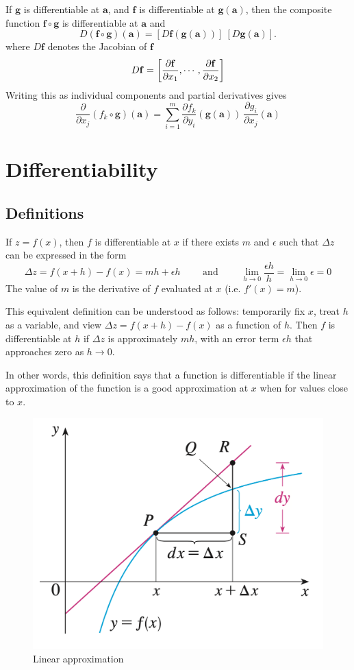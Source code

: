 If $\mathbf g$ is differentiable at $\mathbf a$, and $\mathbf f$ is differentiable at $\mathbf{g}(\mathbf{a})$, then the composite function $\mathbf f \circ \mathbf g$ is differentiable at $\mathbf a$ and
$$
D(\mathbf f\circ\mathbf g)(\mathbf a) = [D\mathbf f(\mathbf g(\mathbf a))] \ [D\mathbf g(\mathbf a)].
$$
where $D\mathbf f$ denotes the Jacobian of $\mathbf f$
$$
D\mathbf f = \left[ \frac{\partial \mathbf f}{\partial x_1}, \cdots, \frac{\partial \mathbf f}{\partial x_2} \right]
$$
Writing this as individual components and partial derivatives gives
$$
\frac {\partial }{\partial x_j} (f_k\circ \mathbf g)(\mathbf a) 
=\sum_{i=1}^m \frac{\partial f_k}{\partial y_i}(\mathbf g(\mathbf a)) \ \frac{\partial g_i}{\partial x_j}(\mathbf a)
$$

\section{Differentiability}

\subsection{Definitions}

\begin{definition}
If $z=f(x)$, then $f$ is differentiable at $x$ if there exists $m$ and $\epsilon$ such that $\Delta z$ can be expressed in the form
$$
\Delta z = f(x+h)-f(x) = mh + \epsilon h \qquad \text{ and } \qquad \lim_{h \to 0} \frac{\epsilon h}{h} = \lim_{h\to 0} \epsilon = 0
$$
The value of $m$ is the derivative of $f$ evaluated at $x$ (i.e. $f'(x)=m$).
\end{definition}

This equivalent definition can be understood as follows: temporarily fix $x$, treat $h$  as a variable, and view $\Delta z = f(x+h)-f(x)$ as a function of $h$. Then $f$ is differentiable at $h$ if $\Delta z$ is approximately $mh$, with an error term $\epsilon h$ that approaches zero as $h \to 0$.

In other words, this definition says that a function is differentiable if the linear approximation of the function is a good approximation at $x$ when for values close to $x$.

\begin{figure}[h]
    \centering
    \includegraphics[width=0.4\linewidth]{figures/linear-appox.png}
    \caption{Linear approximation}
    \label{fig:linear-approx}
\end{figure}

